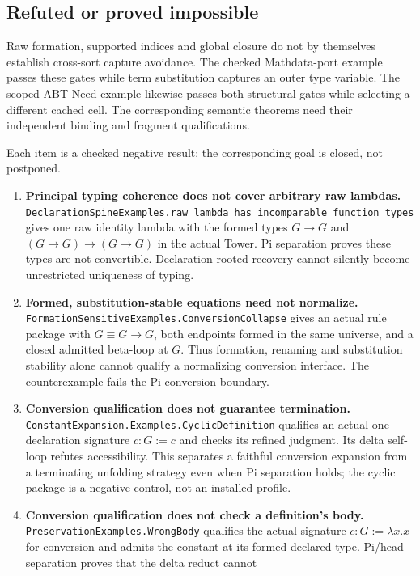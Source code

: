 \documentclass[11pt]{article}
\theoremstyle{definition}
\theoremstyle{remark}
\begin{document}
\subsection{Refuted or proved impossible}

Raw formation, supported indices and global closure do not by themselves
establish cross-sort capture avoidance. The checked Mathdata-port example
passes these gates while term substitution captures an outer type variable.
The scoped-ABT Need example likewise passes both structural gates while
selecting a different cached cell. The corresponding semantic theorems need
their independent binding and fragment qualifications.

Each item is a checked negative result; the corresponding goal is closed, not
postponed.

\begin{enumerate}
\item \textbf{Principal typing coherence does not cover arbitrary raw lambdas.}
  \nolinkurl{DeclarationSpineExamples.raw_lambda_has_incomparable_function_types}
  gives one raw identity lambda with the formed types $G\to G$ and
  $(G\to G)\to(G\to G)$ in the actual Tower. Pi separation proves these
  types are not convertible. Declaration-rooted recovery cannot silently
  become unrestricted uniqueness of typing.
\item \textbf{Formed, substitution-stable equations need not normalize.}
  \nolinkurl{FormationSensitiveExamples.ConversionCollapse} gives an actual
  rule package with $G\equiv G\to G$, both endpoints formed in the same
  universe, and a closed admitted beta-loop at $G$. Thus formation,
  renaming and substitution stability alone cannot qualify a normalizing
  conversion interface. The counterexample fails the Pi-conversion boundary.
\item \textbf{Conversion qualification does not guarantee termination.}
  \nolinkurl{ConstantExpansion.Examples.CyclicDefinition} qualifies an actual
  one-declaration signature $c:G:=c$ and checks its refined judgment. Its
  delta self-loop refutes accessibility. This separates a faithful conversion
  expansion from a terminating unfolding strategy even when Pi separation
  holds; the cyclic package is a negative control, not an installed profile.
\item \textbf{Conversion qualification does not check a definition's body.}
  \nolinkurl{PreservationExamples.WrongBody} qualifies the actual signature
  $c:G:=\lambda x.x$ for conversion and admits the constant at its formed
  declared type. Pi/head separation proves that the delta reduct cannot

\end{enumerate}
\end{document}
